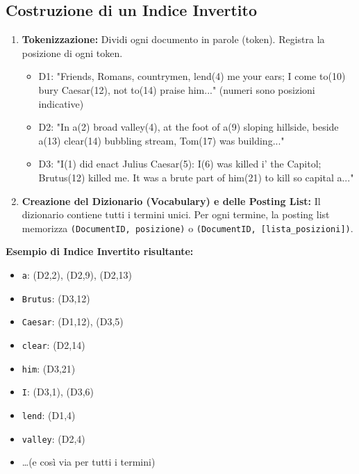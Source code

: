 \subsection{Costruzione di un Indice Invertito}
\begin{enumerate}
    \item \textbf{Tokenizzazione:} Dividi ogni documento in parole (token). Registra la posizione di ogni token.
    \begin{itemize}
        \item D1: "Friends, Romans, countrymen, lend(4) me your ears; I come to(10) bury Caesar(12), not to(14) praise him..." (numeri sono posizioni indicative)
        \item D2: "In a(2) broad valley(4), at the foot of a(9) sloping hillside, beside a(13) clear(14) bubbling stream, Tom(17) was building..."
        \item D3: "I(1) did enact Julius Caesar(5): I(6) was killed i' the Capitol; Brutus(12) killed me. It was a brute part of him(21) to kill so capital a..."
    \end{itemize}
    \item \textbf{Creazione del Dizionario (Vocabulary) e delle Posting List:}
    Il dizionario contiene tutti i termini unici. Per ogni termine, la posting list memorizza \texttt{(DocumentID, posizione)} o \texttt{(DocumentID, [lista\_posizioni])}.
\end{enumerate}

\textbf{Esempio di Indice Invertito risultante:}
\begin{itemize}
    \item \texttt{a}: (D2,2), (D2,9), (D2,13)
    \item \texttt{Brutus}: (D3,12)
    \item \texttt{Caesar}: (D1,12), (D3,5)
    \item \texttt{clear}: (D2,14)
    \item \texttt{him}: (D3,21)
    \item \texttt{I}: (D3,1), (D3,6)
    \item \texttt{lend}: (D1,4)
    \item \texttt{valley}: (D2,4)
    \item \dots (e così via per tutti i termini)
\end{itemize}

